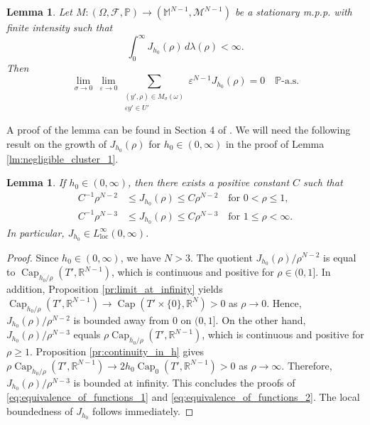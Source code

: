 \documentclass{article}
\numberwithin{equation}{section}
\newtheorem{lemma}[theorem]{Lemma}
\theoremstyle{definition}
\theoremstyle{remark}
\newcommand{\cpct}{\operatorname{Cap}}
\begin{document}
\begin{lemma} \label{lm:thinned_limit}
    Let $M :(\Omega, \mathcal{F}, \mathbb{P}) \rightarrow (\mathbb{M}^{N - 1}, \mathcal{M}^{N - 1})$ be a stationary m.p.p. with finite intensity such that
    \[
    \int_0^\infty J_{h_0}(\rho) \, d\lambda(\rho) < \infty.
    \]
    Then
    \[
    \lim_{\sigma \to 0} \, \lim_{\varepsilon \to 0} \sum \limits_{\substack{(y', \rho) \in M_\sigma(\omega) \\ \varepsilon y' \in U'}} \varepsilon^{N - 1} J_{h_0}(\rho) = 0 \quad \mathbb{P}\text{-a.s.}
    \]
\end{lemma}

 A proof of the lemma can be found in Section 4 of \cite{B}. We will need the following result on the growth of $J_{h_0}(\rho)$ for $h_0 \in (0, \infty)$ in the proof of Lemma \ref{lm:negligible_cluster_1}.

\begin{lemma} \label{lm:equivalence_of_functions}
    If $h_0 \in (0, \infty)$, then there exists a positive constant $C$ such that 
    \begin{align} \label{eq:equivalence_of_functions_1}
        C^{-1} \rho^{N - 2} &\le J_{h_0}(\rho) \le C \rho^{N - 2} \quad \text{for } 0 < \rho \le 1, \\ \label{eq:equivalence_of_functions_2}
        C^{-1} \rho^{N - 3} &\le J_{h_0}(\rho) \le C \rho^{N - 3} \quad \text{for } 1 \le \rho < \infty.
    \end{align}
    In particular, $J_{h_0} \in L_\mathrm{loc}^\infty(0, \infty)$.
\end{lemma}

\begin{proof}
    Since $h_0 \in (0, \infty)$, we have $N > 3$. The quotient $J_{h_0}(\rho)/\rho^{N - 2}$ is equal to $\cpct_{h_0/\rho}(T', \mathbb{R}^{N - 1})$, which is continuous and positive for $\rho \in (0, 1]$. In addition, Proposition \ref{pr:limit_at_infinity} yields $\cpct_{h_0/\rho}(T', \mathbb{R}^{N - 1}) \to \cpct(T' \times \{0\}, \mathbb{R}^N) > 0$ as $\rho \to 0$. Hence, $J_{h_0}(\rho)/\rho^{N - 2}$ is bounded away from $0$ on $(0, 1]$. On the other hand, $J_{h_0}(\rho)/\rho^{N - 3}$ equals $\rho \cpct_{h_0/\rho}(T', \mathbb{R}^{N - 1})$, which is continuous and positive for $\rho \ge 1$. Proposition \ref{pr:continuity_in_h} gives $\rho \cpct_{h_0/\rho}(T', \mathbb{R}^{N - 1}) \to 2h_0 \cpct_0(T', \mathbb{R}^{N - 1}) > 0$ as $\rho \to \infty$. Therefore, $J_{h_0}(\rho)/\rho^{N - 3}$ is bounded at infinity. This concludes the proofs of \eqref{eq:equivalence_of_functions_1} and \eqref{eq:equivalence_of_functions_2}. The local boundedness of $J_{h_0}$ follows immediately.
\end{proof}
\end{document}
